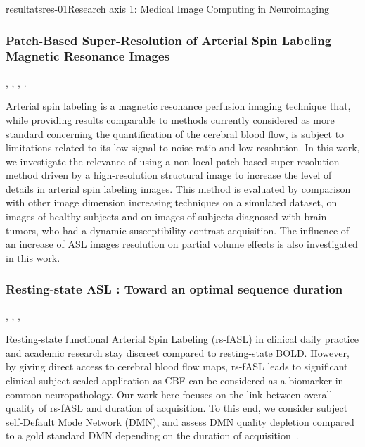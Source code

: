 \documentclass{ra2018}
\begin{document}
\begin{module}{resultats}{res-01}{Research axis 1: Medical Image Computing in Neuroimaging}
\subsubsection{Patch-Based Super-Resolution of Arterial Spin Labeling Magnetic Resonance Images}
\begin{participants}
      , 
      , 
      ,
      .
\end{participants}
Arterial spin labeling is a magnetic resonance perfusion imaging technique that, while providing results comparable to methods currently considered as more standard concerning the quantification of the cerebral blood flow, is subject to limitations related to its low signal-to-noise ratio and low resolution. In this work, we investigate the relevance of using a non-local patch-based super-resolution method driven by a high-resolution structural image to increase the level of details in arterial spin labeling images. This method is evaluated by comparison with other image dimension increasing techniques on a simulated dataset, on images of healthy subjects and on images of subjects diagnosed with brain tumors, who had a dynamic susceptibility contrast acquisition. The influence of an increase of ASL images resolution on partial volume effects is also investigated in this work.~\cite{meuree:inserm-01880726}

\subsubsection{Resting-state ASL : Toward an optimal sequence duration}
\begin{participants}
      , 
      ,
      ,
\end{participants}
Resting-state functional Arterial Spin Labeling (rs-fASL) in clinical daily practice and academic research stay discreet compared to resting-state BOLD. However, by giving direct access to cerebral blood flow maps, rs-fASL leads to significant clinical subject scaled application as CBF can be considered as a biomarker in common neuropathology. Our work here focuses on the link between overall quality of rs-fASL and duration of acquisition. To this end, we consider subject self-Default Mode Network (DMN), and assess DMN quality depletion compared to a gold standard DMN depending on the duration of acquisition~\cite{vallee:inserm-01935089}.



\end{module}
\end{document}
